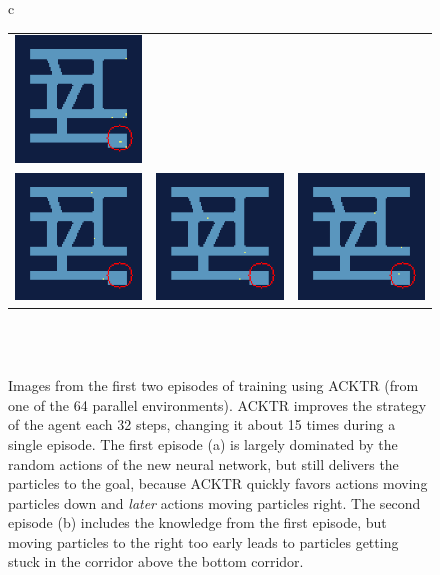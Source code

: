 \begin{figure} [htp]
\begin{center}
\begin{tabular}{c}
\begin{tabular}{ccc}
                \includegraphics[width=0.26\columnwidth]{figures/evaluation/algorithms/training_example/acktr/44_k.png} \\
                \addlinespace[0.2cm]
                \includegraphics[width=0.26\columnwidth]{figures/evaluation/algorithms/training_example/acktr/51_k.png} &
                \includegraphics[width=0.26\columnwidth]{figures/evaluation/algorithms/training_example/acktr/58_k.png} & 
                \includegraphics[width=0.26\columnwidth]{figures/evaluation/algorithms/training_example/acktr/65_k.png} \\
            \end{tabular} \\
             \\
        \end{tabular}
    \end{center}
    \caption[Images During Training Episodes with ACKTR]{Images from the first two episodes of training using ACKTR (from one of the 64 parallel environments). ACKTR improves the strategy of the agent each 32 steps, changing it about 15 times during a single episode. The first episode (a) is largely dominated by the random actions of the new neural network, but still delivers the particles to the goal, because ACKTR quickly favors actions moving particles down and \textit{later} actions moving particles right. The second episode (b) includes the knowledge from the first episode, but moving particles to the right too early leads to particles getting stuck in the corridor above the bottom corridor.} \label{fig:AcktrTrainingEpisodes}
\end{figure}
